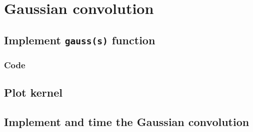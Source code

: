 \documentclass[abstract=true]{scrartcl}
\begin{document}
\section{Gaussian convolution}

    \subsection{Implement \texttt{gauss(s)} function}

        \subsubsection{Code}

    \subsection{Plot kernel}


    \subsection{Implement and time the Gaussian convolution}

        
\end{document}
